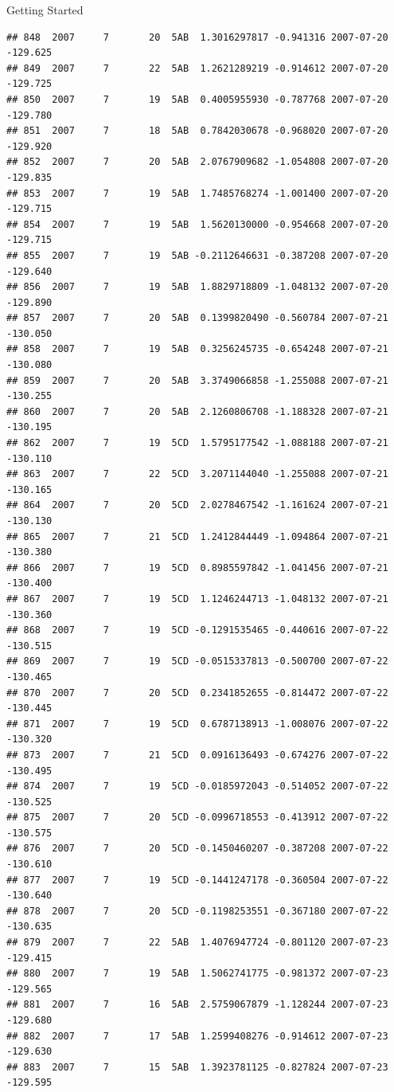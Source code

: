 \documentclass[
  ignorenonframetext,
]{beamer}
\begin{document}
\begin{frame}[fragile]{Getting Started}
\begin{verbatim}
## 848  2007     7       20  5AB  1.3016297817 -0.941316 2007-07-20 -129.625
## 849  2007     7       22  5AB  1.2621289219 -0.914612 2007-07-20 -129.725
## 850  2007     7       19  5AB  0.4005955930 -0.787768 2007-07-20 -129.780
## 851  2007     7       18  5AB  0.7842030678 -0.968020 2007-07-20 -129.920
## 852  2007     7       20  5AB  2.0767909682 -1.054808 2007-07-20 -129.835
## 853  2007     7       19  5AB  1.7485768274 -1.001400 2007-07-20 -129.715
## 854  2007     7       19  5AB  1.5620130000 -0.954668 2007-07-20 -129.715
## 855  2007     7       19  5AB -0.2112646631 -0.387208 2007-07-20 -129.640
## 856  2007     7       19  5AB  1.8829718809 -1.048132 2007-07-20 -129.890
## 857  2007     7       20  5AB  0.1399820490 -0.560784 2007-07-21 -130.050
## 858  2007     7       19  5AB  0.3256245735 -0.654248 2007-07-21 -130.080
## 859  2007     7       20  5AB  3.3749066858 -1.255088 2007-07-21 -130.255
## 860  2007     7       20  5AB  2.1260806708 -1.188328 2007-07-21 -130.195
## 862  2007     7       19  5CD  1.5795177542 -1.088188 2007-07-21 -130.110
## 863  2007     7       22  5CD  3.2071144040 -1.255088 2007-07-21 -130.165
## 864  2007     7       20  5CD  2.0278467542 -1.161624 2007-07-21 -130.130
## 865  2007     7       21  5CD  1.2412844449 -1.094864 2007-07-21 -130.380
## 866  2007     7       19  5CD  0.8985597842 -1.041456 2007-07-21 -130.400
## 867  2007     7       19  5CD  1.1246244713 -1.048132 2007-07-21 -130.360
## 868  2007     7       19  5CD -0.1291535465 -0.440616 2007-07-22 -130.515
## 869  2007     7       19  5CD -0.0515337813 -0.500700 2007-07-22 -130.465
## 870  2007     7       20  5CD  0.2341852655 -0.814472 2007-07-22 -130.445
## 871  2007     7       19  5CD  0.6787138913 -1.008076 2007-07-22 -130.320
## 873  2007     7       21  5CD  0.0916136493 -0.674276 2007-07-22 -130.495
## 874  2007     7       19  5CD -0.0185972043 -0.514052 2007-07-22 -130.525
## 875  2007     7       20  5CD -0.0996718553 -0.413912 2007-07-22 -130.575
## 876  2007     7       20  5CD -0.1450460207 -0.387208 2007-07-22 -130.610
## 877  2007     7       19  5CD -0.1441247178 -0.360504 2007-07-22 -130.640
## 878  2007     7       20  5CD -0.1198253551 -0.367180 2007-07-22 -130.635
## 879  2007     7       22  5AB  1.4076947724 -0.801120 2007-07-23 -129.415
## 880  2007     7       19  5AB  1.5062741775 -0.981372 2007-07-23 -129.565
## 881  2007     7       16  5AB  2.5759067879 -1.128244 2007-07-23 -129.680
## 882  2007     7       17  5AB  1.2599408276 -0.914612 2007-07-23 -129.630
## 883  2007     7       15  5AB  1.3923781125 -0.827824 2007-07-23 -129.595

\end{verbatim}
\end{frame}
\end{document}
